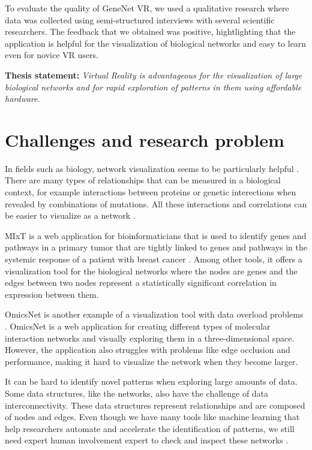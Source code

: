 To evaluate the quality of GeneNet VR, we used a qualitative research where data was collected using semi-structured interviews with several scientific researchers. The feedback that we obtained was positive, hightlighting that the application is helpful for the visualization of biological networks and easy to learn even for novice VR users.

\textbf{Thesis statement: } \emph{Virtual Reality is advantageous for the visualization of large biological networks and for rapid exploration of patterns in them using affordable hardware}.

\section{Challenges and research problem}

In fields such as biology, network visualization seems to be particularly helpful \cite{pujana_network_modeling} \cite{fraser_view_function}. There are many types of relationships that can be measured in a biological context, for example interactions between proteins or genetic interections when revealed by combinations of mutations. All these interactions and correlations can be easier to visualize as a network \cite{merico_visualization}.

MIxT \cite{fjukstad_dumeaux_olsen_lund_hallett_bongo_2017} is a web application for bioinformaticians that is used to identify genes and pathways in a primary tumor that are tightly linked to genes and pathways in the systemic response of a patient with breast cancer \cite{dumeaux_fjukstad_interactions_tumor_blood}. Among other tools, it offers a visualization tool for the biological networks where the nodes are genes and the edges between two nodes represent a statistically significant correlation in expression between them.

OmicsNet is another example of a visualization tool with data overload problems \cite{omnicsnet}. OmicsNet is a web application for creating different types of molecular interaction networks and visually exploring them in a three-dimensional space. However, the application also struggles with problems like edge occlusion and performance, making it hard to visualize the network when they become larger.

It can be hard to identify novel patterns when exploring large amounts of data. Some data structures, like the networks, also have the challenge of data interconnectivity. These data structures represent relationships and are composed of nodes and edges. Even though we have many tools like machine learning that help researchers automate and accelerate the identification of patterns, we still need expert human involvement expert to check and inspect these networks \cite{network_expert}.


